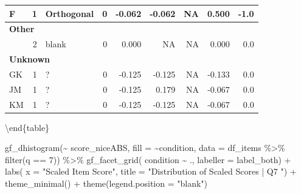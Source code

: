 \documentclass[
  letterpaper,
  DIV=11,
  numbers=noendperiod]{scrreprt}
\newenvironment{Shaded}{\begin{snugshade}}{\end{snugshade}}
\newcommand{\AttributeTok}[1]{\textcolor[rgb]{0.40,0.45,0.13}{#1}}
\newcommand{\DecValTok}[1]{\textcolor[rgb]{0.68,0.00,0.00}{#1}}
\newcommand{\FunctionTok}[1]{\textcolor[rgb]{0.28,0.35,0.67}{#1}}
\newcommand{\NormalTok}[1]{\textcolor[rgb]{0.00,0.23,0.31}{#1}}
\newcommand{\SpecialCharTok}[1]{\textcolor[rgb]{0.37,0.37,0.37}{#1}}
\newcommand{\StringTok}[1]{\textcolor[rgb]{0.13,0.47,0.30}{#1}}
\begin{document}
\begin{tabular}[t]{l|r|l|r|r|r|r|r|r}
\hline
\hspace{1em}F & 1 & Orthogonal & 0 & -0.062 & -0.062 & NA & 0.500 & -1.0\\
\hline
\multicolumn{9}{l}{\textbf{Other}}\\
\hline
\hspace{1em} & 2 & blank & 0 & 0.000 & NA & NA & 0.000 & 0.0\\
\hline
\multicolumn{9}{l}{\textbf{Unknown}}\\
\hline
\hspace{1em}GK & 1 & ? & 0 & -0.125 & -0.125 & NA & -0.133 & 0.0\\
\hline
\hspace{1em}JM & 1 & ? & 0 & -0.125 & 0.179 & NA & -0.067 & 0.0\\
\hline
\hspace{1em}KM & 1 & ? & 0 & -0.125 & -0.125 & NA & -0.067 & 0.0\\
\hline
\end{tabular}

\textbackslash end\{table\}

\begin{Shaded}
\begin{Highlighting}[]
\FunctionTok{gf\_dhistogram}\NormalTok{(}\SpecialCharTok{\textasciitilde{}}\NormalTok{ score\_niceABS, }\AttributeTok{fill =} \SpecialCharTok{\textasciitilde{}}\NormalTok{condition, }\AttributeTok{data =}\NormalTok{ df\_items }\SpecialCharTok{\%\textgreater{}\%} \FunctionTok{filter}\NormalTok{(q }\SpecialCharTok{==} \DecValTok{7}\NormalTok{)) }\SpecialCharTok{\%\textgreater{}\%} 
  \FunctionTok{gf\_facet\_grid}\NormalTok{( condition }\SpecialCharTok{\textasciitilde{}}\NormalTok{ ., }\AttributeTok{labeller =}\NormalTok{ label\_both) }\SpecialCharTok{+} 
  \FunctionTok{labs}\NormalTok{( }\AttributeTok{x =} \StringTok{"Scaled Item Score"}\NormalTok{, }\AttributeTok{title =} \StringTok{"Distribution of Scaled Scores | Q7 "}\NormalTok{) }\SpecialCharTok{+} 
  \FunctionTok{theme\_minimal}\NormalTok{() }\SpecialCharTok{+} \FunctionTok{theme}\NormalTok{(}\AttributeTok{legend.position =} \StringTok{"blank"}\NormalTok{)}
\end{Highlighting}
\end{Shaded}
\end{document}
